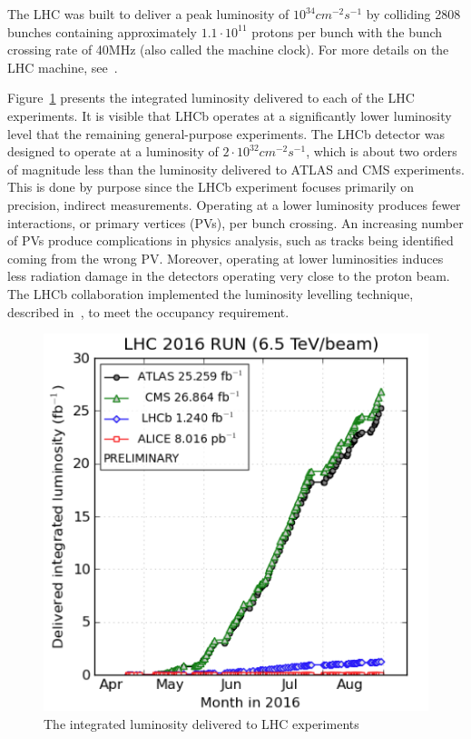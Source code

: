 The LHC was built to deliver a peak luminosity of $10^{34} cm^{-2}s^{-1}$ by colliding 2808 bunches containing approximately $1.1 \cdot 10^{11}$ protons per bunch with the bunch crossing rate of 40MHz (also called the machine clock).  For more details on the LHC machine, see~\cite{LHC_machine}.

Figure~\ref{fig:Luminosity} presents the integrated luminosity delivered to each of the LHC experiments. It is visible that LHCb operates at a significantly lower luminosity level that the remaining general-purpose experiments.  The LHCb detector was designed to operate at a luminosity of $2 \cdot 10^{32}cm^{-2}s^{-1}$, which is about two orders of magnitude less than the luminosity delivered to ATLAS and CMS experiments. This is done by purpose since the LHCb experiment focuses primarily on precision, indirect measurements. Operating at a lower luminosity produces fewer interactions, or primary vertices (PVs), per bunch crossing. An increasing number of PVs produce complications in physics analysis, such as tracks being identified coming from the wrong PV.  Moreover, operating at lower luminosities induces less radiation damage in the detectors operating very close to the proton beam. The LHCb collaboration implemented the luminosity levelling technique, described in~\cite{lumi_down}, to meet the occupancy requirement. 

\begin{figure}
\centering
\includegraphics[scale=0.5]{figures/Luminosity.png}
\caption[Luminosity]{The integrated luminosity delivered to LHC experiments
\label{fig:Luminosity}}
\end{figure}

